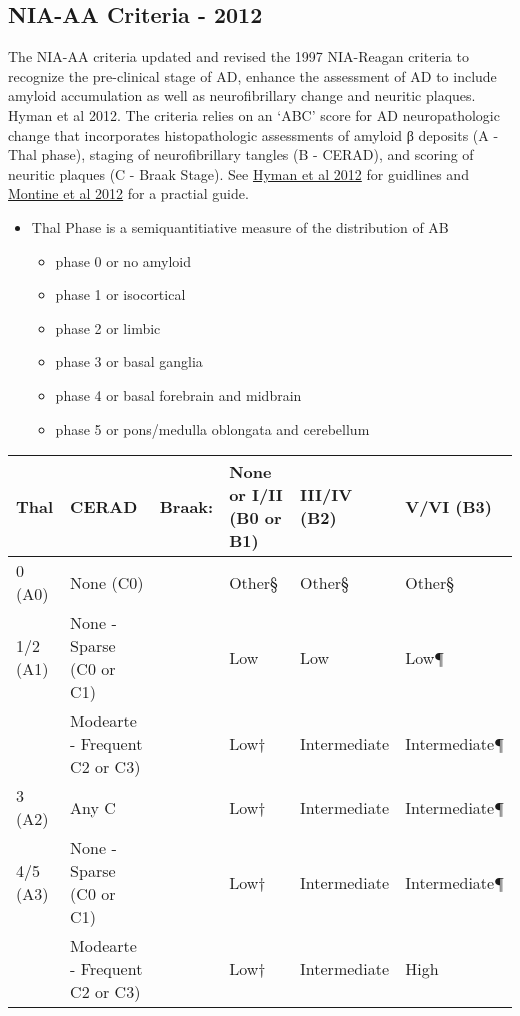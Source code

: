 \documentclass[]{book}
\providecommand{\tightlist}{%
  \setlength{\itemsep}{0pt}\setlength{\parskip}{0pt}}
\begin{document}
\hypertarget{nia-aa-criteria---2012}{%
\subsection{NIA-AA Criteria - 2012}\label{nia-aa-criteria---2012}}

The NIA-AA criteria updated and revised the 1997 NIA-Reagan criteria to recognize the pre-clinical stage of AD, enhance the assessment of AD to include amyloid accumulation as well as neurofibrillary change and neuritic plaques. Hyman et al 2012. The criteria relies on an `ABC' score for AD neuropathologic change that incorporates histopathologic assessments of amyloid β deposits (A - Thal phase), staging of neurofibrillary tangles (B - CERAD), and scoring of neuritic plaques (C - Braak Stage). See \href{https://doi.org/10.1016/j.jalz.2011.10.007}{Hyman et al 2012} for guidlines and \href{https://doi.org/10.1007/s00401-011-0910-3}{Montine et al 2012} for a practial guide.

\begin{itemize}
\tightlist
\item
  Thal Phase is a semiquantitiative measure of the distribution of AB

  \begin{itemize}
  \tightlist
  \item
    phase 0 or no amyloid
  \item
    phase 1 or isocortical
  \item
    phase 2 or limbic
  \item
    phase 3 or basal ganglia
  \item
    phase 4 or basal forebrain and midbrain
  \item
    phase 5 or pons/medulla oblongata and cerebellum
  \end{itemize}
\end{itemize}

\begin{longtable}[]{@{}llllll@{}}
\toprule
Thal & CERAD & Braak: & None or I/II (B0 or B1) & III/IV (B2) & V/VI (B3)\tabularnewline
\midrule
\endhead
0 (A0) & None (C0) & & Other§ & Other§ & Other§\tabularnewline
1/2 (A1) & None - Sparse (C0 or C1) & & Low & Low & Low¶\tabularnewline
& Modearte - Frequent C2 or C3) & & Low† & Intermediate & Intermediate¶\tabularnewline
3 (A2) & Any C & & Low† & Intermediate & Intermediate¶\tabularnewline
4/5 (A3) & None - Sparse (C0 or C1) & & Low† & Intermediate & Intermediate¶\tabularnewline
& Modearte - Frequent C2 or C3) & & Low† & Intermediate & High\tabularnewline
\bottomrule
\end{longtable}
\end{document}
